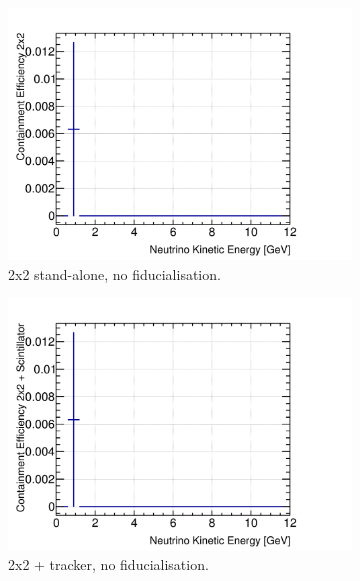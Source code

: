 \documentclass[10pt,a4paper,openany]{article}
\begin{document}
\begin{figure}[htbp]
	\centering
	\begin{subfigure}[b]{0.49\textwidth}
		\centering
		\includegraphics[width=1.0\textwidth]{E_cont_eff_2x2.png}
		\caption{2x2 stand-alone, no fiducialisation.}
		\label{}
	\end{subfigure}	
	\hfill
	\begin{subfigure}[b]{0.49\textwidth}
		\centering
		\includegraphics[width=1.0\textwidth]{E_cont_eff_2x2_Scintillator_gap.png}
		\caption{2x2 + tracker, no fiducialisation.}
		\label{}
	\end{subfigure}	
	\begin{subfigure}[b]{0.49\textwidth}
		\centering

\end{subfigure}
\end{figure}
\end{document}
